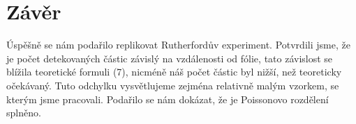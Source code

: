 \documentclass[czech,11pt,a4paper]{article}
\begin{document}
\begin{multicols}{2}
\begin{figure}[H]
		\end{figure}
		
		
		\section{Závěr}
		Úspěšně se nám podařilo replikovat Rutherfordův experiment. Potvrdili jsme, že je počet detekovaných částic závislý na vzdálenosti od fólie, tato závislost se blížila teoretické formuli (7), nicméně náš počet částic byl nižší, než teoreticky očekávaný. Tuto odchylku vysvětlujeme zejména relativně malým vzorkem, se kterým jsme pracovali. Podařilo se nám dokázat, že je Poissonovo rozdělení splněno.
	\end{multicols}
\printbibliography
			
		
		
\end{document}
